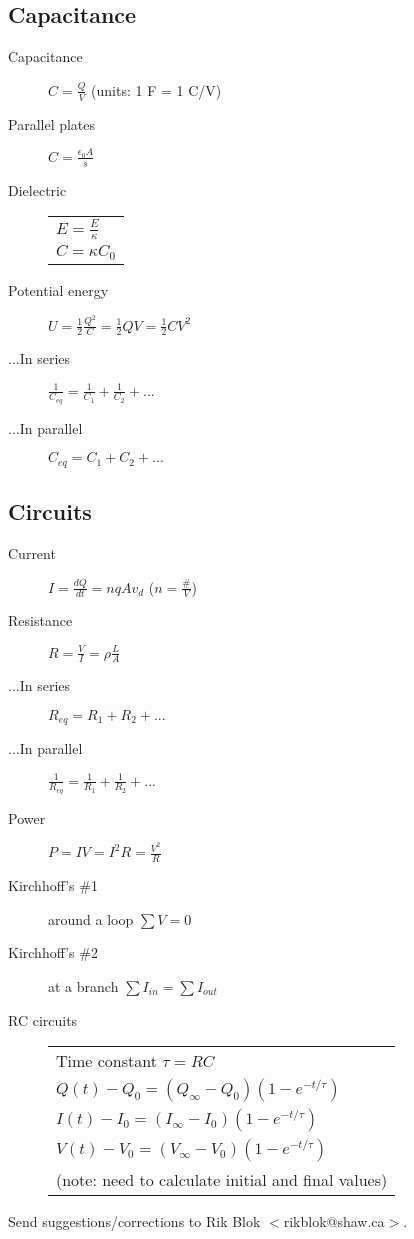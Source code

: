\documentclass{article}
\newcommand{\bd}{\begin{description}}
\newcommand{\ed}{\end{description}}
\newcommand{\half}{\frac{1}{2}}
\begin{document}
\subsection{Capacitance}
\bd
 \item[Capacitance] $ C = \frac{Q}{V} $ (units: 1 F = 1 C/V)
 \item[Parallel plates] $ C = \frac{\epsilon_0 A}{s} $
 \item[Dielectric]
  \begin{tabular}{l}
   $ E = \frac{E}{\kappa} $ \\
   $ C = \kappa C_0 $
  \end{tabular}
 \item[Potential energy] $ U = \half \frac{Q^2}{C} = \half Q V = \half C V^2 $
 \item[...In series] $ \frac{1}{C_{eq}} = \frac{1}{C_1} + \frac{1}{C_2} +...$
 \item[...In parallel] $ C_{eq} = C_1 + C_2 + ... $
\ed

\subsection{Circuits}
\bd
 \item[Current] $ I = \frac{dQ}{dt} = nqAv_d $ ($n = \frac{\#}{V}$)
 \item[Resistance] $ R = \frac{V}{I} = \rho \frac{L}{A} $
 \item[...In series] $ R_{eq} = R_1 + R_2 + ... $
 \item[...In parallel] $\frac{1}{R_{eq}} = \frac{1}{R_1} + \frac{1}{R_2} + ... $
 \item[Power] $ P = I V  = I^2 R = \frac{V^2}{R} $
 \item[Kirchhoff's \#1] around a loop $ \sum V = 0 $
 \item[Kirchhoff's \#2] at a branch $ \sum I_{in} = \sum I_{out} $
 \item[RC circuits]
  \begin{tabular}{l}
   Time constant $ \tau = R C $ \\
   $ Q(t) - Q_0 = \left(Q_\infty - Q_0\right) \left(1 - e^{-t/\tau}\right)$ \\
   $ I(t) - I_0 = \left(I_\infty - I_0\right) \left(1 - e^{-t/\tau}\right)$ \\
   $ V(t) - V_0 = \left(V_\infty - V_0\right) \left(1 - e^{-t/\tau}\right)$ \\
   (note: need to calculate initial and final values)
  \end{tabular}
\ed

\vspace{1in}\noindent Send suggestions/corrections to Rik Blok $<$rikblok@shaw.ca$>$.
\end{document}
